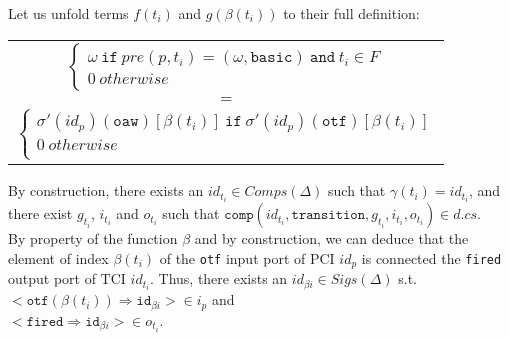 \documentclass[dvipsnames,12pt]{article}
\begin{document}
\begin{niproof}
\begin{enumerate}
\begin{itemize}
\begin{itemize}
        Let us unfold terms $f(t_i)$ and $g(\beta(t_i))$ to their full definition:
        \begin{frameb}
          \begin{tabular}{c}
            $\begin{cases}
              \omega~\mathtt{if}~pre(p,t_i)=(\omega,\mathtt{basic})~\mathtt{and}~t_i\in{}F\\
              0~otherwise
            \end{cases}$ \\
            $=$ \\
            $\begin{cases}
              \sigma'(id_p)(\texttt{oaw})[\beta(t_i)]~\mathtt{if}~\sigma'(id_p)(\texttt{otf})[\beta(t_i)]\\
              0~otherwise\\
            \end{cases}$ \\
          \end{tabular}
        \end{frameb}
        
        By construction, there exists an
        $id_{t_i}\in{}Comps(\Delta)$ such that
        $\gamma(t_i)=id_{t_i}$, and there exist $g_{t_i}$, $i_{t_i}$
        and $o_{t_i}$ such that
        $\mathtt{comp}(id_{t_i},\texttt{transition},g_{t_i},i_{t_i},o_{t_i})\in{}d.cs$.\\
        
        By property of the function $\beta$ and by construction, we
        can deduce that the element of index $\beta(t_i)$ of the
        \texttt{otf} input port of PCI $id_p$ is connected the
        \texttt{fired} output port of TCI $id_{t_i}$. Thus, there
        exists an $id_{\beta{}i}\in{}Sigs(\Delta)$ s.t.
        ${<}\texttt{otf}(\beta(t_i))\mathtt{\Rightarrow{}id}_{\beta{}i}{>}\in{}i_p$
        and\\
        ${<}\texttt{fired}\mathtt{\Rightarrow{}id}_{\beta{}i}{>}\in{}o_{t_i}$.


\end{itemize}
\end{itemize}
\end{enumerate}
\end{niproof}
\end{document}
